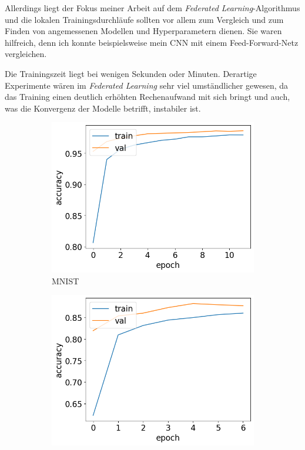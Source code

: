 Allerdings liegt der Fokus meiner Arbeit auf dem \textit{Federated Learning}-Algorithmus und die lokalen Trainingsdurchläufe sollten vor allem zum Vergleich und zum Finden von angemessenen Modellen und Hyperparametern dienen. Sie waren hilfreich, denn ich konnte beispielsweise mein CNN mit einem Feed-Forward-Netz vergleichen. 

Die Trainingszeit liegt bei wenigen Sekunden oder Minuten. Derartige Experimente wären im \textit{Federated Learning} sehr viel umständlicher gewesen, da das Training einen deutlich erhöhten Rechenaufwand mit sich bringt und auch, was die Konvergenz der Modelle betrifft, instabiler ist.

\begin{figure}
	\centering
	\begin{subfigure}{0.32\textwidth}
		\centering
		\includegraphics[width=\textwidth]{Bilder/mnist-results-local.png}
		\caption{MNIST}
	\end{subfigure}
	\begin{subfigure}{0.32\textwidth}
		\centering
		\includegraphics[width=\textwidth]{Bilder/svhn-results-local.png}

\end{subfigure}
\end{figure}
